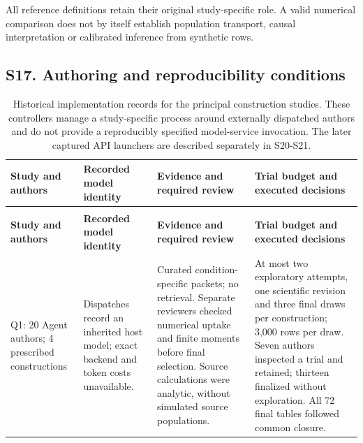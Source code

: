 \documentclass[11pt,letterpaper]{article}
\begin{document}
All reference definitions retain their original study-specific role. A valid numerical comparison does not by itself establish population transport, causal interpretation or calibrated inference from synthetic rows.


\clearpage

\subsection*{S17. Authoring and reproducibility conditions}

\FloatBarrier

\begingroup

\small

\renewcommand{\arraystretch}{1.22}

\begin{xltabular}{\linewidth}{@{}>{\raggedright\arraybackslash}X>{\raggedright\arraybackslash}X>{\raggedright\arraybackslash}X>{\raggedright\arraybackslash}X@{}}

\caption{Historical implementation records for the principal construction studies. These controllers manage a study-specific process around externally dispatched authors and do not provide a reproducibly specified model-service invocation. The later captured API launchers are described separately in S20-S21.}\label{tab:17} \\

\toprule

\textbf{Study and authors} & \textbf{Recorded model identity} & \textbf{Evidence and required review} & \textbf{Trial budget and executed decisions} \\

\midrule

\endfirsthead

\\

\toprule

\textbf{Study and authors} & \textbf{Recorded model identity} & \textbf{Evidence and required review} & \textbf{Trial budget and executed decisions} \\

\midrule

\endhead

\bottomrule

\endfoot

Q1: 20 Agent authors; 4 prescribed constructions & Dispatches record an inherited host model; exact backend and token costs unavailable. & Curated condition-specific packets; no retrieval. Separate reviewers checked numerical uptake and finite moments before final selection. Source calculations were analytic, without simulated source populations. & At most two exploratory attempts, one scientific revision and three final draws per construction; 3,000 rows per draw. Seven authors inspected a trial and retained; thirteen finalized without exploration. All 72 final tables followed common closure. \\


\end{xltabular}
\end{document}
